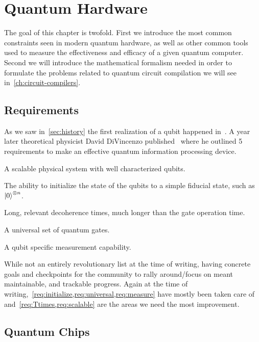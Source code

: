 \chapter{Quantum Hardware}\label{ch:hardware}

The goal of this chapter is twofold.
First we introduce the most common constraints seen in modern quantum hardware, as well as other common tools used to measure the effectiveness and efficacy of a given quantum computer.
Second we will introduce the mathematical formalism needed in order to formulate the problems related to quantum circuit compilation we will see in~\cref{ch:circuit-compilers}.

\section{Requirements}
As we saw in~\cref{sec:history} the first realization of a qubit happened in~\citeyear{firstqubit}.
A year later theoretical physicist David DiVincenzo published~\cite{divincenzo} where he outlined 5 requirements to make an effective quantum information processing device.
\begin{requirements}
    \item A scalable physical system with well characterized qubits.\label{req:scalable}
    \item The ability to initialize the state of the qubits to a simple fiducial state, such as $\ket{0}^{\otimes n}$.\label{req:initialize}
    \item Long, relevant decoherence times, much longer than the gate operation time.\label{req:Ttimes}
    \item A universal set of quantum gates.\label{req:universal}
    \item A qubit specific measurement capability.\label{req:measure}
\end{requirements}
While not an entirely revolutionary list at the time of writing, having concrete goals and checkpoints for the community to rally around/focus on meant maintainable, and trackable progress.
Again at the time of writing,~\cref{req:initialize,req:universal,req:measure} have mostly been taken care of and~\cref{req:Ttimes,req:scalable} are the areas we need the most improvement.

\section{Quantum Chips}

